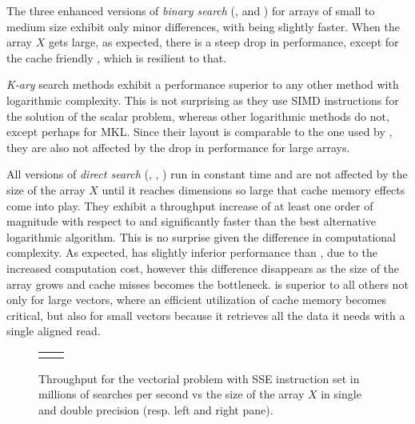 \documentclass[preprint,1p,times]{elsarticle}
\begin{document}
The three enhanced versions of \textit{binary search} (\textit{\BitSetName}, \textit{\ClassicOffsetName} and \textit{\EytzingerName}) for arrays of small to medium size exhibit only minor differences, with \textit{\BitSetName} being slightly faster. When the array $X$ gets large, as expected, there is a steep drop in performance, except for the cache friendly \textit{\EytzingerName}, which is resilient to that.

\textit{K-ary} search methods exhibit a performance superior to any other method with logarithmic complexity. This is not surprising as they use SIMD instructions for the solution of the scalar problem, whereas other logarithmic methods do not, except perhaps for MKL. Since their layout is comparable to the one used by \textit{\EytzingerName}, they are also not affected by the drop in performance for large arrays.

All versions of \textit{direct search} (\textit{\DirectName}, \textit{\DirectGapName}, \textit{\DirectCacheName}) run in constant time and are not affected by the size of the array $X$ until it reaches dimensions so large that cache memory effects come into play. They exhibit a throughput increase of at least one order of magnitude with respect to \textit{\ClassicName} and significantly faster than the best alternative logarithmic algorithm. This is no surprise given the difference in computational complexity. As expected, \textit{\DirectGapName} has slightly inferior performance than \textit{\DirectName}, due to the increased computation cost, however this difference disappears as the size of the array grows and cache misses becomes the bottleneck. \textit{\DirectCacheName} is superior to all others not only for large vectors, where an efficient utilization of cache memory becomes critical, but also for small vectors because it retrieves all the data it needs with a single aligned read.

\begin{figure}%
	\begin{tabular}{@{\hskip1pt}c@{\hskip1pt} @{\hskip1pt}c@{\hskip1pt}}
		\perfchart{SSE}{single} & \perfchart{SSE}{double}
	\end{tabular}
	\vspace*{-4mm}
	\caption{Throughput for the vectorial problem with SSE instruction set in millions of searches per second vs the size of the array $X$ in single and double precision (resp. left and right pane).}
	\label{fig:perf-SSE}%
\end{figure}
\end{document}
